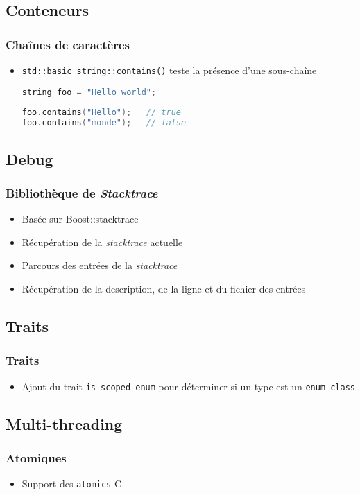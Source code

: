 \documentclass[C++.tex]{subfiles}
\begin{document}
\subsection*{Conteneurs}
\begin{frame}[fragile]
	\frametitle{Chaînes de caractères}
	\begin{itemize}
		\item \lstinline|std::basic_string::contains()| teste la présence d'une sous-chaîne

		\begin{lstlisting}[language=C++]
string foo = "Hello world";
	
foo.contains("Hello");   // true
foo.contains("monde");   // false\end{lstlisting}
	\end{itemize}


\end{frame}

\subsection*{Debug}
\begin{frame}[fragile]
	\frametitle{Bibliothèque de \textit{Stacktrace}}
	\begin{itemize}
		\item Basée sur Boost::stacktrace
		\item Récupération de la \textit{stacktrace} actuelle
		\item Parcours des entrées de la \textit{stacktrace}
		\item Récupération de la description, de la ligne et du fichier des entrées
	\end{itemize}
\end{frame}

\subsection*{Traits}
\begin{frame}[fragile]
	\frametitle{Traits}
	\begin{itemize}
		\item Ajout du trait \lstinline|is_scoped_enum| pour déterminer si un type est un \lstinline|enum class|
	\end{itemize}
\end{frame}

\subsection*{Multi-threading}
\begin{frame}[fragile]
	\frametitle{Atomiques}
	\begin{itemize}
		\item Support des \lstinline|atomics| C
	\end{itemize}
\end{frame}
\end{document}
